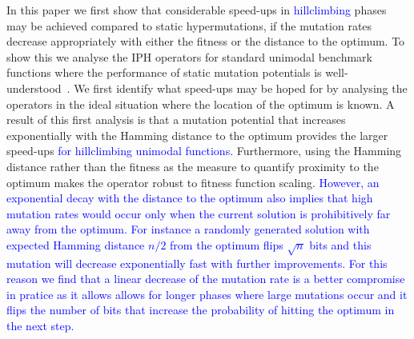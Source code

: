\documentclass[lettersize,journal]{IEEEtran}
\newcommand{\new}[1]{\textcolor{blue}{#1}}
\begin{document}
In this paper we first show that considerable speed-ups in \new{hillclimbing} phases may be achieved compared to static hypermutations, 
if the mutation rates decrease appropriately with either the fitness or the distance to the optimum. 
To show this we analyse the IPH operators for standard unimodal benchmark functions where the performance of static mutation potentials is well-understood~\cite{CorusOlivetoYazdaniGECCO2017}.
We first identify what speed-ups may be hoped for by analysing the operators in the ideal situation where the location of the optimum is known.
A result of this first analysis is that a mutation potential that increases exponentially with the Hamming distance to the optimum %
provides the larger speed-ups \new{for hillclimbing unimodal functions}. Furthermore, using the Hamming distance rather than the fitness as the measure to quantify proximity to the optimum
makes the operator robust to fitness function scaling.
\new{However, an exponential decay with the distance to the optimum also implies that high mutation rates would occur only when the current solution is prohibitively far away from the optimum. For instance a randomly generated solution with expected Hamming distance $n/2$ from the optimum flips $\sqrt{n}$ bits and this mutation will decrease exponentially fast with further improvements. For this reason we find that a linear decrease of the mutation rate is a better compromise in pratice as it allows allows for longer phases where large mutations occur} \textcolor{blue}{ and it flips the number of bits that increase the probability of hitting the optimum in the next step.}
\end{document}
